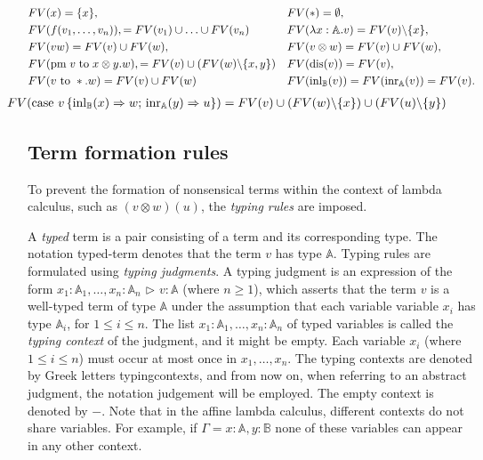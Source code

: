 \begin{equation*}
\begin{split}
&FV(x) = \{x\}, &&  FV(*) = \emptyset,  \\
&FV(f(v_1, \ldots, v_n)), = FV(v_1) \cup \ldots \cup FV(v_n)&& FV(\lambda x: \mathbb{A}. v) = FV(v) \backslash \{x\}, \\
&FV(v w) = FV(v) \cup FV(w), && FV(v \otimes w) = FV(v) \cup FV(w), \\
& FV(\text{pm} \hspace{3 pt} v \hspace{3 pt} \text{to} \hspace{3 pt} x \otimes y. w), = FV(v) \cup (FV(w)  \backslash \{x,y\}) && FV(\text{dis}(v)) = FV(v),\\
&FV(v \text{ to } *.w) = FV(v) \cup FV(w)  &&  FV(\text{inl}_{\mathbb{B}} (v)) =  FV(\text{inr}_{\mathbb{A}} (v)) = FV(v). \\
\end{split}
\end{equation*}
\vspace{-20pt}
\begin{equation*}
  \begin{split}
& \hspace{-30pt} FV(\text{case } v \,   \{\text{inl}_{\typeB} (x) \Rightarrow w ; \, \text{inr}_{\typeA} (y) \Rightarrow u\}) = FV(v) \cup  (FV(w) \backslash \{x\}) \cup (FV(u)\backslash \{y\})
\end{split}
\end{equation*}


\subsection{Term formation rules}

To prevent the formation of nonsensical terms within the context of lambda calculus, such as $(v \otimes w) (u)$, the \emph{typing rules} are imposed.

A \emph{typed} term is a pair consisting of a term and its corresponding type. The notation \gls{typed-term} denotes that the term $v$ has type $\mathbb{A}$. Typing rules are formulated using \emph{typing judgments}. A typing judgment is an expression of the form $x_{1}: \mathbb{A}_{1}, \ldots, x_{n}: \mathbb{A}_{n} \hspace{1pt} \triangleright \hspace{1pt} v: \mathbb{A}$ (where $n \geq 1$), which asserts that the term $v$ is a well-typed term of type $\mathbb{A}$ under the assumption that each variable variable $x_{i}$ has type $\mathbb{A}_{i}$, for $1 \leq i \leq n$. The list $x_{1}: \mathbb{A}_{1}, \ldots, x_{n}: \mathbb{A}_{n}$ of typed variables is called the \emph{typing context} of the judgment, and it might be empty.  Each variable $x_i$ (where $1 \leq i \leq n$) must occur at most once in $x_1, \ldots, x_n$. The typing contexts are denoted by Greek letters \gls{typingcontexts}, and from now on, when referring to an abstract judgment, the notation \gls{judgement} will be employed.
 The empty context is denoted by $-$. Note that in the affine lambda calculus, different contexts do not share variables. For example, if $\Gamma = x:\mathbb{A},y:\mathbb{B}$ none of these variables can appear in any other context. 


